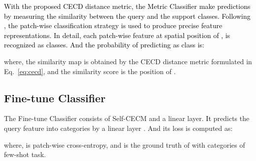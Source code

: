 \documentclass{article}
\newcommand{\seasons}[1]{\textcolor{black}{#1}}
\newcommand{\jinxiang}[1]{\textcolor{black}{#1}}
\begin{document}
\jinxiang{With the proposed CECD distance metric, the Metric Classifier make predictions by measuring the similarity between the query and the  support classes.
Following \cite{hou2019cross}, the patch-wise classification strategy is used to produce precise feature representations.
In detail, each patch-wise feature  at  spatial position of , is recognized as  classes.
And the probability of predicting  as  class is:}
\begin{small}

\end{small}where, the similarity map  is obtained by the CECD distance metric formulated in Eq.~\ref{eq:cecd}, and the similarity score  is the  position of .

\subsection{Fine-tune Classifier}
The Fine-tune Classifier consists of Self-CECM and a linear layer.
\seasons{It} predicts the query feature  into  categories by a linear layer .
And its loss is computed as:
\begin{small}

\end{small}where,  is patch-wise cross-entropy, and  is the ground truth of  with  categories of few-shot task.
\end{document}
